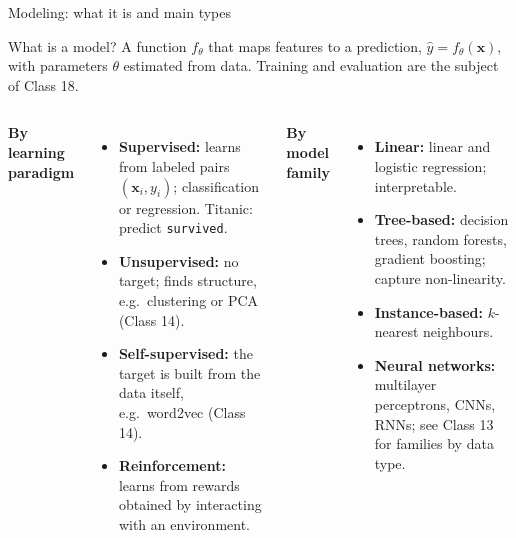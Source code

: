 \begin{frame}{Modeling: what it is and main types}
\begin{block}{What is a model?}\small
A function $f_{\theta}$ that maps features to a prediction, $\hat{y} = f_{\theta}(\mathbf{x})$, with parameters $\theta$ estimated from data. Training and evaluation are the subject of Class 18.
\end{block}
\begin{columns}[T]
\textbf{By learning paradigm}
\begin{itemize}\footnotesize
\item \textbf{Supervised:} learns from labeled pairs $(\mathbf{x}_i, y_i)$; classification or regression. Titanic: predict \texttt{survived}.
\item \textbf{Unsupervised:} no target; finds structure, e.g.\ clustering or PCA (Class 14).
\item \textbf{Self-supervised:} the target is built from the data itself, e.g.\ word2vec (Class 14).
\item \textbf{Reinforcement:} learns from rewards obtained by interacting with an environment.
\end{itemize}
\textbf{By model family}
\begin{itemize}\footnotesize
\item \textbf{Linear:} linear and logistic regression; interpretable.
\item \textbf{Tree-based:} decision trees, random forests, gradient boosting; capture non-linearity.
\item \textbf{Instance-based:} $k$-nearest neighbours.
\item \textbf{Neural networks:} multilayer perceptrons, CNNs, RNNs; see Class 13 for families by data type.
\end{itemize}
\end{columns}
\coursefooter
\end{frame}
